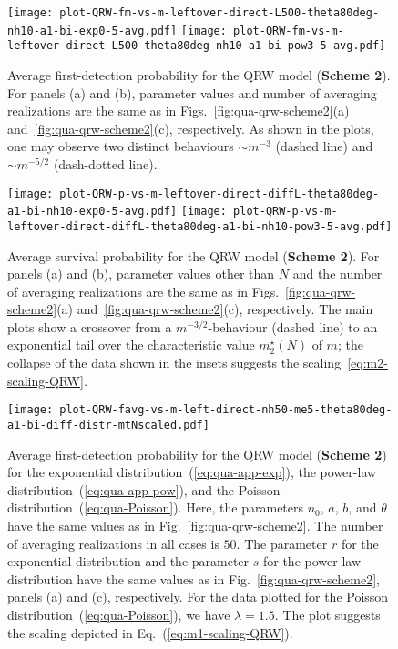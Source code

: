 \documentclass[12pt]{iopart}
\begin{document}
\begin{figure}[!htbp]
\centering
\texttt{[image: plot-QRW-fm-vs-m-leftover-direct-L500-theta80deg-nh10-a1-bi-exp0-5-avg.pdf]} \hskip5pt 
\texttt{[image: plot-QRW-fm-vs-m-leftover-direct-L500-theta80deg-nh10-a1-bi-pow3-5-avg.pdf]}   
\caption{Average first-detection probability for the QRW model (\textbf{Scheme 2}).  For panels (a) and (b), parameter values and number of averaging realizations are the same as in Figs.~\ref{fig:qua-qrw-scheme2}(a) and~\ref{fig:qua-qrw-scheme2}(c), respectively.  As shown in the plots, one may observe two distinct behaviours $\sim m^{-3}$ (dashed line) and $\sim m^{-5/2}$ (dash-dotted line).}
\label{fig:qrw-f-vs-m-exp-pow}
\end{figure}

\begin{figure}[!htbp]
\centering
\texttt{[image: plot-QRW-p-vs-m-leftover-direct-diffL-theta80deg-a1-bi-nh10-exp0-5-avg.pdf]} \hskip5pt 
\texttt{[image: plot-QRW-p-vs-m-leftover-direct-diffL-theta80deg-a1-bi-nh10-pow3-5-avg.pdf]}   
\caption{Average survival probability for the QRW model (\textbf{Scheme 2}).  For panels (a) and (b), parameter values other than $N$ and the number of averaging realizations are the same as in Figs.~\ref{fig:qua-qrw-scheme2}(a) and~\ref{fig:qua-qrw-scheme2}(c), respectively.  The main plots show a crossover from a $m^{-3/2}$-behaviour (dashed line) to an exponential tail over the characteristic value $m_2^\star(N)$ of $m$; the collapse of the data shown in the insets suggests the scaling~\eqref{eq:m2-scaling-QRW}.}
\label{fig:qrw-N-dependence}
\end{figure}

\begin{figure}[!htbp]
\centering
\texttt{[image: plot-QRW-favg-vs-m-left-direct-nh50-me5-theta80deg-a1-bi-diff-distr-mtNscaled.pdf]} 
\caption{Average first-detection probability for the QRW model (\textbf{Scheme 2}) for the exponential distribution~(\ref{eq:qua-app-exp}), the power-law distribution~(\ref{eq:qua-app-pow}), and the Poisson distribution~(\ref{eq:qua-Poisson}).  Here, the parameters $n_0$,  $a$,  $b$, and $\theta$ have the same values as in Fig.~\ref{fig:qua-qrw-scheme2}.  The number of averaging realizations in all cases is $50$.  The parameter $r$ for the exponential distribution and the parameter $s$ for the power-law distribution have the same values as in Fig.~\ref{fig:qua-qrw-scheme2}, panels (a) and (c), respectively.  
For the data plotted for the Poisson distribution~(\ref{eq:qua-Poisson}), we have $\lambda=1.5$.
The plot suggests the scaling depicted in Eq.~(\ref{eq:m1-scaling-QRW}). }
\label{fig:qrw-fm}
\end{figure}
\end{document}
